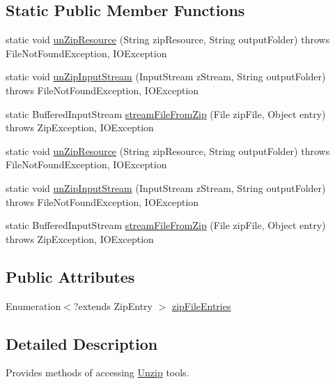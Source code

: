 \subsection*{Static Public Member Functions}
\begin{DoxyCompactItemize}
\item 
static void \hyperlink{class_c_a_s_u_a_l_1_1archiving_1_1_unzip_a20374a024e3d57ee34f7d2f1f6e79e6f}{un\-Zip\-Resource} (String zip\-Resource, String output\-Folder)  throws File\-Not\-Found\-Exception, I\-O\-Exception 
\item 
static void \hyperlink{class_c_a_s_u_a_l_1_1archiving_1_1_unzip_ac13b6d000c8747a6d73874cc7c95bfa8}{un\-Zip\-Input\-Stream} (Input\-Stream z\-Stream, String output\-Folder)  throws File\-Not\-Found\-Exception, I\-O\-Exception 
\item 
static Buffered\-Input\-Stream \hyperlink{class_c_a_s_u_a_l_1_1archiving_1_1_unzip_a040693a39393fa52d90c18180f7543ea}{stream\-File\-From\-Zip} (File zip\-File, Object entry)  throws Zip\-Exception, I\-O\-Exception 
\item 
static void \hyperlink{class_c_a_s_u_a_l_1_1archiving_1_1_unzip_a20374a024e3d57ee34f7d2f1f6e79e6f}{un\-Zip\-Resource} (String zip\-Resource, String output\-Folder)  throws File\-Not\-Found\-Exception, I\-O\-Exception 
\item 
static void \hyperlink{class_c_a_s_u_a_l_1_1archiving_1_1_unzip_ac13b6d000c8747a6d73874cc7c95bfa8}{un\-Zip\-Input\-Stream} (Input\-Stream z\-Stream, String output\-Folder)  throws File\-Not\-Found\-Exception, I\-O\-Exception 
\item 
static Buffered\-Input\-Stream \hyperlink{class_c_a_s_u_a_l_1_1archiving_1_1_unzip_a040693a39393fa52d90c18180f7543ea}{stream\-File\-From\-Zip} (File zip\-File, Object entry)  throws Zip\-Exception, I\-O\-Exception 
\end{DoxyCompactItemize}
\subsection*{Public Attributes}
\begin{DoxyCompactItemize}
\item 
Enumeration$<$?extends Zip\-Entry $>$ \hyperlink{class_c_a_s_u_a_l_1_1archiving_1_1_unzip_a00e829444ec7b41520e4e61972306b22}{zip\-File\-Entries}
\end{DoxyCompactItemize}


\subsection{Detailed Description}
Provides methods of accessing \hyperlink{class_c_a_s_u_a_l_1_1archiving_1_1_unzip}{Unzip} tools.


